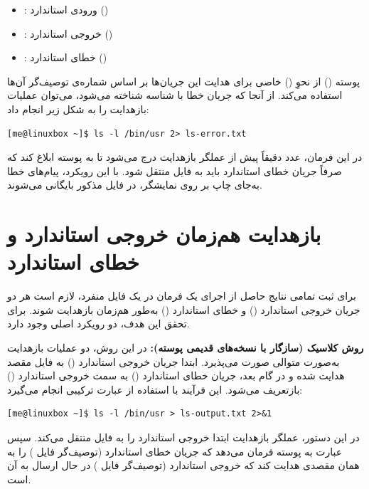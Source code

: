 \begin{itemize}
  \item {}: ورودی استاندارد ()
  \item {}: خروجی استاندارد ()
  \item {}: خطای استاندارد ()
\end{itemize}

پوسته () از نحوِ () خاصی برای هدایت این جریان‌ها بر اساس شماره‌ی توصیف‌گر آن‌ها استفاده می‌کند. از آنجا که جریان خطا با شناسه  شناخته می‌شود، می‌توان عملیات بازهدایت را به شکل زیر انجام داد:

\begin{latin}
\begin{lstlisting}
[me@linuxbox ~]$ ls -l /bin/usr 2> ls-error.txt
\end{lstlisting}
\end{latin}

در این فرمان، عدد  دقیقاً پیش از عملگر بازهدایت \cmd{>} درج می‌شود تا به پوسته ابلاغ کند که صرفاً جریان خطای استاندارد باید به فایل  منتقل شود. با این رویکرد، پیام‌های خطا به‌جای چاپ بر روی نمایشگر، در فایل مذکور بایگانی می‌شوند.

\section{بازهدایت هم‌زمان خروجی استاندارد و خطای استاندارد}

برای ثبت تمامی نتایج حاصل از اجرای یک فرمان در یک فایل منفرد، لازم است هر دو جریان خروجی استاندارد () و خطای استاندارد () به‌طور هم‌زمان بازهدایت شوند. برای تحقق این هدف، دو رویکرد اصلی وجود دارد.

\textbf{روش کلاسیک (سازگار با نسخه‌های قدیمی پوسته):} در این روش، دو عملیات بازهدایت به‌صورت متوالی صورت می‌پذیرد. ابتدا جریان خروجی استاندارد () به فایل مقصد هدایت شده و در گام بعد، جریان خطای استاندارد () به سمت خروجی استاندارد () بازتعریف می‌شود. این فرآیند با استفاده از عبارت ترکیبی  انجام می‌گیرد:

\begin{latin}
\begin{lstlisting}
[me@linuxbox ~]$ ls -l /bin/usr > ls-output.txt 2>&1
\end{lstlisting}
\end{latin}

در این دستور، عملگر بازهدایت \cmd{>} ابتدا خروجی استاندارد را به فایل  منتقل می‌کند. سپس عبارت  به پوسته فرمان می‌دهد که جریان خطای استاندارد (توصیف‌گر فایل ) را به همان مقصدی هدایت کند که خروجی استاندارد (توصیف‌گر فایل ) در حال ارسال به آن است.


